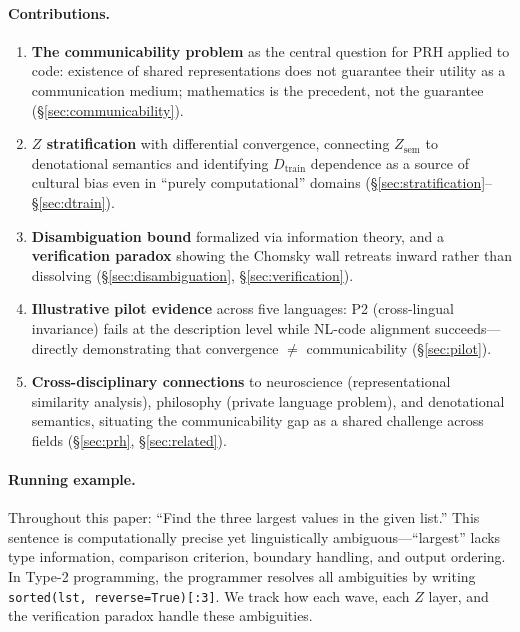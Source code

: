 \documentclass[11pt]{article}
\theoremstyle{definition}
\newcommand{\Zsem}{Z_{\text{sem}}}
\newcommand{\Dtrain}{D_{\text{train}}}
\begin{document}
\paragraph{Contributions.}
\begin{enumerate}[label=(\arabic*),nosep]
  \item \textbf{The communicability problem} as the central question for PRH applied to code: existence of shared representations does not guarantee their utility as a communication medium; mathematics is the precedent, not the guarantee (\S\ref{sec:communicability}).
  \item \textbf{$Z$ stratification} with differential convergence, connecting $\Zsem$ to denotational semantics and identifying $\Dtrain$ dependence as a source of cultural bias even in ``purely computational'' domains (\S\ref{sec:stratification}--\S\ref{sec:dtrain}).
  \item \textbf{Disambiguation bound} formalized via information theory, and a \textbf{verification paradox} showing the Chomsky wall retreats inward rather than dissolving (\S\ref{sec:disambiguation}, \S\ref{sec:verification}).
  \item \textbf{Illustrative pilot evidence} across five languages: P2 (cross-lingual invariance) fails at the description level while NL-code alignment succeeds---directly demonstrating that convergence $\neq$ communicability (\S\ref{sec:pilot}).
  \item \textbf{Cross-disciplinary connections} to neuroscience (representational similarity analysis), philosophy (private language problem), and denotational semantics, situating the communicability gap as a shared challenge across fields (\S\ref{sec:prh}, \S\ref{sec:related}).
\end{enumerate}

\paragraph{Running example.}
Throughout this paper: ``Find the three largest values in the given list.'' This sentence is computationally precise yet linguistically ambiguous---``largest'' lacks type information, comparison criterion, boundary handling, and output ordering. In Type-2 programming, the programmer resolves all ambiguities by writing \texttt{sorted(lst, reverse=True)[:3]}. We track how each wave, each $Z$ layer, and the verification paradox handle these ambiguities.
\end{document}
